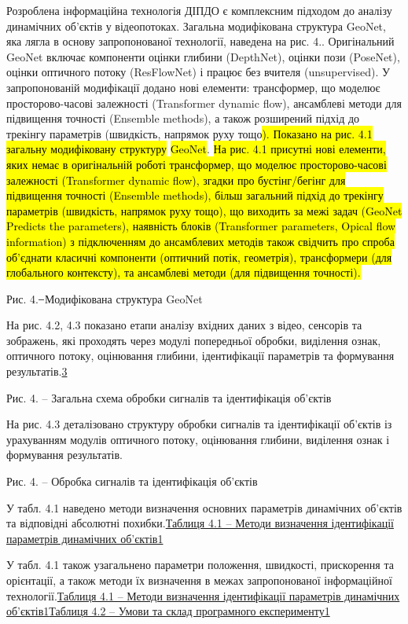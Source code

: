 \documentclass[
]{article}
\begin{document}
Розроблена інформаційна технологія ДІПДО є комплексним підходом до аналізу динамічних об'єктів у відеопотоках. Загальна модифікована структура GeoNet, яка лягла в основу запропонованої технології, наведена на рис. 4.. Оригінальний GeoNet включає компоненти оцінки глибини (DepthNet), оцінки пози (PoseNet), оцінки оптичного потоку (ResFlowNet) і працює без вчителя (unsupervised). У запропонованій модифікації додано нові елементи: трансформер, що моделює просторово-часові залежності (Transformer dynamic flow), ансамблеві методи для підвищення точності (Ensemble methods), а також розширений підхід до трекінгу параметрів (швидкість, напрямок руху тощо\hl{). Показано на рис. 4.1 загальну модифіковану структуру} \hl{GeoNet}. \hl{На рис. 4.1 присутні нові елементи, яких немає в оригінальній роботі трансформер, що моделює просторово-часові залежності (Transformer dynamic flow), згадки про бустінг/бегінг для підвищення точності (Ensemble methods), більш загальний підхід до трекінгу параметрів (швидкість, напрямок руху тощо), що виходить за межі задач (GeoNet Predicts the parameters), наявність блоків (Transformer parameters, Opical flow information) з підключенням до ансамблевих методів також свідчить про спроба об'єднати класичні компоненти (оптичний потік, геометрія), трансформери (для глобального контексту), та ансамблеві методи (для підвищення точності).}

Рис. 4. ̶ Модифікована структура GeoNet

На рис. 4.2, 4.3 показано етапи аналізу вхідних даних з відео, сенсорів та зображень, які проходять через модулі попередньої обробки, виділення ознак, оптичного потоку, оцінювання глибини, ідентифікації параметрів та формування результатів.\hyperref[_Ref226899803]{3}

Рис. 4. -- Загальна схема обробки сигналів та ідентифікація об'єктів

На рис. 4.3 деталізовано структуру обробки сигналів та ідентифікації об'єктів із урахуванням модулів оптичного потоку, оцінювання глибини, виділення ознак і формування результатів.

Рис. 4. -- Обробка сигналів та ідентифікація об'єктів

У табл. 4.1 наведено методи визначення основних параметрів динамічних об'єктів та відповідні абсолютні похибки.\hyperref[_Ref221399609]{Таблиця 4.1 -- Методи визначення ідентифікації параметрів динамічних об'єктів1}

У табл. 4.1 також узагальнено параметри положення, швидкості, прискорення та орієнтації, а також методи їх визначення в межах запропонованої інформаційної технології.\hyperref[_Ref221399609]{Таблиця 4.1 -- Методи визначення ідентифікації параметрів динамічних об'єктів1}\hyperref[_Ref226482723]{Таблиця 4.2 -- Умови та склад програмного експерименту1}
\end{document}
